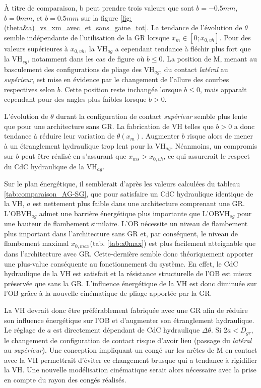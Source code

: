 À titre de comparaison, b peut prendre trois valeurs que sont $b=-0.5mm$, $b=0mm$, et $b=0.5mm$ sur la figure \ref{fig:(theta&a)_vs_xm_avec_et_sans_gaine_tot}. La tendance de l'évolution de $\theta$ semble indépendante de l'utilisation de la GR lorsque $x_m\in[0;x_{0,vh}]$. Pour des valeurs supérieures à $x_{0,vh}$, la VH$_{ag}$ a cependant tendance à fléchir plus fort que la VH$_{sg}$, notamment dans les cas de figure où $b\leq 0$. La position de M, menant au basculement des configurations de pliage des VH$_{ag}$, du contact \emph{latéral} au \emph{supérieur}, est mise en évidence par le changement de l'allure des courbes respectives selon $b$. Cette position reste inchangée lorsque $b \leq 0$, mais apparaît cependant pour des angles plus faibles lorsque $b > 0$.

L'évolution de $\theta$ durant la configuration de contact \emph{supérieur} semble plus lente que pour une architecture sans GR. La fabrication de VH telles que $b>0$ a donc tendance à réduire leur variation de $\theta(x_m)$. Augmenter $b$ risque alors de mener à un étranglement hydraulique trop lent pour la VH$_{ag}$. Néanmoins, un compromis sur $b$ peut être réalisé en s'assurant que $x_{ms}>x_{0,vh}$, ce qui assurerait le respect du CdC hydraulique de la VH$_{ag}$.

Sur le plan énergétique, il semblerait d'après les valeurs calculées du tableau \ref{tab:comparaison_AG-SG}, que pour satisfaire un CdC hydraulique identique de la VH, $a$ est nettement plus faible dans une architecture comprenant une GR. L'OBVH$_{ag}$ admet une barrière énergétique plus importante que  L'OBVH$_{sg}$ pour une hauteur de flambement similaire. L'OB nécessite un niveau de flambement plus important dans l'architecture sans GR et, par conséquent, le niveau de flambement maximal $x_{0,max}$(tab. \ref{tab:x0max}) est plus facilement atteignable que dans l'architecture avec GR. Cette-dernière semble donc théoriquement apporter une plus-value conséquente au fonctionnement du système. En effet, le CdC hydraulique de la VH est satisfait et la résistance structurelle de l'OB est mieux préservée que sans la GR. L'influence énergétique de la VH est donc diminuée sur l'OB grâce à la nouvelle cinématique de pliage apportée par la GR.

La VH devrait donc être préférablement fabriquée avec une GR afin de réduire son influence énergétique sur l'OB et d'augmenter son étranglement hydraulique. Le réglage de $a$ est directement dépendant de CdC hydraulique $\Delta\theta$. Si $2a<D_{gr}$, le changement de configuration de contact risque d'avoir lieu (passage du \emph{latéral} au \emph{supérieur}). Une conception impliquant un congé sur les arêtes de M en contact avec la VH permettrait d'éviter ce changement brusque qui a tendance à rigidifier la VH. Une nouvelle modélisation cinématique serait alors nécessaire avec la prise en compte du rayon des congés réalisés.

